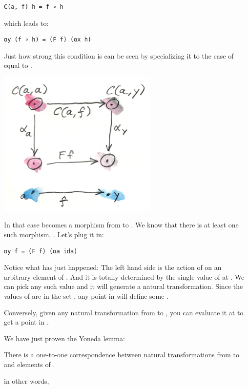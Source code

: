 \begin{verbatim}
C(a, f) h = f ∘ h
\end{verbatim}

which leads to:

\begin{verbatim}
αy (f ∘ h) = (F f) (αx h)
\end{verbatim}

Just how strong this condition is can be seen by specializing it to the
case of  equal to .

\includegraphics[width=3.12500in]{images/yoneda2.png}

In that case  becomes a morphism from  to
. We know that there is at least one such morphism,
. Let's plug it in:

\begin{verbatim}
αy f = (F f) (αa ida)
\end{verbatim}

Notice what has just happened: The left hand side is the action of
 on an arbitrary element  of . And
it is totally determined by the single value of  at
. We can pick any such value and it will generate a natural
transformation. Since the values of  are in the set
, any point in  will define some .

Conversely, given any natural transformation  from
 to , you can evaluate it at  to
get a point in .

We have just proven the Yoneda lemma:

There is a one-to-one correspondence between natural transformations
from  to  and elements of .

in other words,

